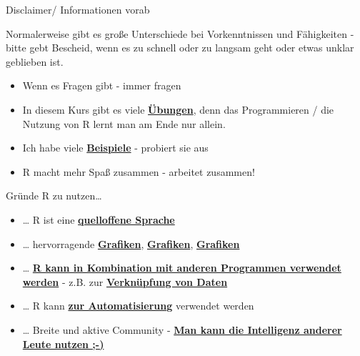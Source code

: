\documentclass[ignorenonframetext,]{beamer}
\providecommand{\tightlist}{%
  \setlength{\itemsep}{0pt}\setlength{\parskip}{0pt}}
\begin{document}
\begin{frame}{Disclaimer/ Informationen vorab}

Normalerweise gibt es große Unterschiede bei Vorkenntnissen und
Fähigkeiten - bitte gebt Bescheid, wenn es zu schnell oder zu langsam
geht oder etwas unklar geblieben ist.

\begin{itemize}
\tightlist
\item
  Wenn es Fragen gibt - immer fragen
\item
  In diesem Kurs gibt es viele
  \href{http://web.math.ku.dk/~helle/R-intro/exercises.pdf}{\textbf{Übungen}},
  denn das Programmieren / die Nutzung von R lernt man am Ende nur
  allein.
\item
  Ich habe viele \href{https://www.showmeshiny.com/}{\textbf{Beispiele}}
  - probiert sie aus
\item
  R macht mehr Spaß zusammen - arbeitet zusammen!
\end{itemize}

\end{frame}

\begin{frame}{Gründe R zu nutzen\ldots{}}

\begin{itemize}
\item
  \ldots{} R ist eine
  \href{https://stackoverflow.com/questions/1546583/what-is-the-definition-of-an-open-source-programming-language}{\textbf{quelloffene
  Sprache}}
\item
  \ldots{} hervorragende
  \href{http://matthewlincoln.net/2014/12/20/adjacency-matrix-plots-with-r-and-ggplot2.html}{\textbf{Grafiken}},
  \href{https://www.r-bloggers.com/3d-plots-with-ggplot2-and-plotly\%20/}{\textbf{Grafiken}},
  \href{https://procomun.wordpress.com/2011/03/18/splomr/}{\textbf{Grafiken}}
\item
  \ldots{} \href{https://github.com/Japhilko/RInterfaces}{\textbf{R kann
  in Kombination mit anderen Programmen verwendet werden}} - z.B. zur
  \href{https://github.com/Japhilko/RInterfaces/blob/master/slides/Datenimport.md}{\textbf{Verknüpfung
  von Daten}}
\item
  \ldots{} R kann
  \href{https://cran.r-project.org/web/packages/MplusAutomation/index.html}{\textbf{zur
  Automatisierung}} verwendet werden
\item
  \ldots{} Breite und aktive Community -
  \href{https://www.r-bloggers.com/}{\textbf{Man kann die Intelligenz
  anderer Leute nutzen ;-)}}
\end{itemize}

\end{frame}
\end{document}
